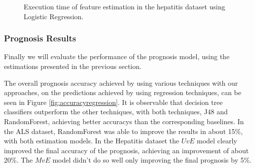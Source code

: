 \begin{figure}[h]
	\begin{subfigmatrix}{2}
	\end{subfigmatrix}
	\caption{Execution time of feature estimation in the hepatitis dataset using Logistic Regression.}
	\label{fig:estimationtimelog}
\end{figure}

\subsubsection{Prognosis Results}
\label{subsubsection:prognosis_regression}

Finally we will evaluate the performance of the prognosis model, using the estimations presented in the previous section.

The overall prognosis accuracy achieved by using various techniques with our approaches, on the predictions achieved by using regression 
techniques, can be seen in Figure \ref{fig:accuracyregression}. It is observable that decision tree classifiers outperform the other techniques, with
both techniques, J48 and RandomForest, achieving better accuracys than the corresponding baselines. In the ALS dataset, RandomForest was able to 
improve the results in about 15\%, with both estimation models. In the Hepatitis dataset the $UvE$ model clearly improved the final
 accuracy of the prognosis, achieving an improvement of about 20\%. The $MvE$ model didn't do so well only improving the final prognosis by 5\%. 

